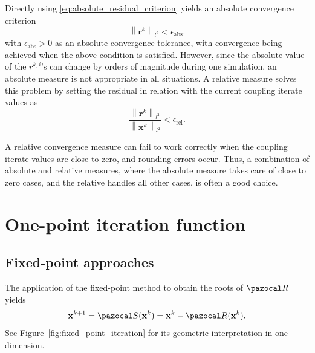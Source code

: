 Directly using \eqref{eq:absolute_residual_criterion} yields an absolute convergence criterion
\begin{equation}
\left\|\boldsymbol{r} ^{k}\right\|_{l^{2}}<\epsilon_\mathrm{abs}.
\end{equation}
with $\epsilon_\mathrm{abs}>0$ as an absolute convergence tolerance, with convergence being achieved when the above condition is satisfied.
However, since the absolute value of the $r^{k, i} $'s can change by orders of magnitude during one simulation, an absolute measure is not appropriate in all situations.
A relative measure solves this problem by setting the residual in relation with the current coupling iterate values as
\begin{equation} \label{eq:def_res_used}
\frac{\left\|\mathbf{r}^{k}\right\|_{l^{2}}}{\left\|\mathbf{x}^{k}\right\|_{l^{2}}}<\epsilon_\mathrm{rel}.
\end{equation}

A relative convergence measure can fail to work correctly when the coupling iterate values are close to zero, and rounding errors occur.
Thus, a combination of absolute and relative measures, where the absolute measure takes care of close to zero cases, and the relative handles all other cases, is often a good choice.



\section{One-point iteration function} \label{sec:one_point_iteration_function}

\subsection{Fixed-point approaches} \label{sec:fixed_point_approach}

The application of the fixed-point method to obtain the roots of \(\pazocal R\) yields
\begin{equation}
  \mathbf x^{k+1} = \pazocal S(\mathbf x^k) = \mathbf x^k - \pazocal R(\mathbf x^k).
\end{equation}
See Figure~\ref{fig:fixed_point_iteration} for its geometric interpretation in one dimension.

